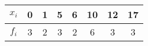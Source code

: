 \begin{tabular}[12pt]{ |c| c| c|c|c|c|c|c|}
    \hline
    $x_i$ & 0 & 1 & 5 & 6 & 10 & 12 & 17 \\ 
    \hline
    $f_{i}$ & 3 & 2 & 3 & 2 & 6 & 3 & 3\\
    \hline 
    \end{tabular} 
